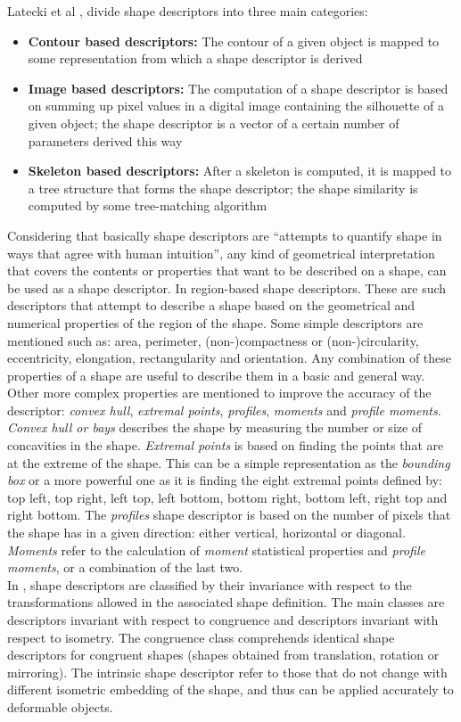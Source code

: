 Latecki et al \cite{shapenonrigid}, divide shape descriptors into three
main categories: 
\begin{itemize}
\item \textbf{Contour based descriptors: }The contour of a given object is 
mapped to some representation from which a shape descriptor is derived
\item \textbf{Image based descriptors: }The computation of a shape descriptor
is based on summing up pixel values in a digital image containing the silhouette
of a given object; the shape descriptor is a vector of a certain number of
parameters derived this way
\item \textbf{Skeleton based descriptors: }After a skeleton is computed, it is
mapped to a tree structure that forms the shape descriptor; the shape similarity
is computed by some tree-matching algorithm 
\end{itemize}

Considering that basically shape descriptors are ``attempts to quantify shape in 
ways that agree with human intuition''\cite[p.1]{desclecture}, any kind of 
geometrical interpretation that covers the contents or properties that want 
to be described on a shape, can be used as a shape descriptor.
In \cite{desclecture} region-based shape descriptors. These are such descriptors
that attempt to describe a shape based on the geometrical and numerical properties
of the region of the shape. Some simple descriptors are mentioned such as:
area, perimeter, (non-)compactness or (non-)circularity, eccentricity, elongation,
rectangularity and orientation. Any combination of these properties of a shape are
useful to describe them in a basic and general way.
Other more complex properties are mentioned to improve the accuracy of the 
descriptor: \emph{convex hull}, \emph{extremal points}, \emph{profiles}, 
\emph{ moments} and \emph{profile moments}. \emph{Convex hull or bays} 
describes the shape by measuring the number or size of concavities in the 
shape. \emph{Extremal points} is based on finding the points that
are at the extreme of the shape. This can be a simple representation as the 
\emph{bounding box} or a more powerful one as it is finding the eight extremal
points defined by: top left, top right, left top, left bottom, bottom right,
bottom left, right top and right bottom. The \emph{profiles} shape descriptor 
is based on the number of pixels that the shape has in a given direction:
 either vertical, horizontal or diagonal. \emph{Moments} refer to the
 calculation of \emph{moment} statistical properties and 
\emph{profile moments}, or a combination of the last two.\\
In \cite{web:wikishape}, shape descriptors are classified by their
invariance with respect to the transformations allowed in the associated
shape definition. The main classes are descriptors invariant with respect 
to congruence and descriptors invariant with respect to isometry. 
The congruence class
comprehends identical shape descriptors for congruent shapes 
(shapes obtained from
translation, rotation or mirroring). The intrinsic shape descriptor refer
to those that do not change with different isometric embedding of the shape,
and thus can be applied accurately to deformable objects.


